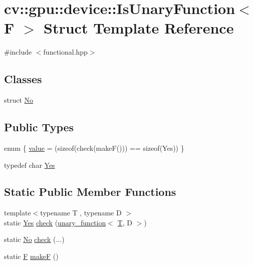 \hypertarget{structcv_1_1gpu_1_1device_1_1IsUnaryFunction}{\section{cv\-:\-:gpu\-:\-:device\-:\-:Is\-Unary\-Function$<$ F $>$ Struct Template Reference}
\label{structcv_1_1gpu_1_1device_1_1IsUnaryFunction}
}


{\ttfamily \#include $<$functional.\-hpp$>$}

\subsection*{Classes}
\begin{DoxyCompactItemize}
\item 
struct \hyperlink{structcv_1_1gpu_1_1device_1_1IsUnaryFunction_1_1No}{No}
\end{DoxyCompactItemize}
\subsection*{Public Types}
\begin{DoxyCompactItemize}
\item 
enum \{ \hyperlink{structcv_1_1gpu_1_1device_1_1IsUnaryFunction_a7682afa8f40d4542d6abc07f46790aa3a819ca7f4c23acab4560d6b157e790dbc}{value} = (sizeof(check(make\-F())) == sizeof(Yes))
 \}
\item 
typedef char \hyperlink{structcv_1_1gpu_1_1device_1_1IsUnaryFunction_af3211ec0f917bee79645b078a0760c7e}{Yes}
\end{DoxyCompactItemize}
\subsection*{Static Public Member Functions}
\begin{DoxyCompactItemize}
\item 
{\footnotesize template$<$typename T , typename D $>$ }\\static \hyperlink{structcv_1_1gpu_1_1device_1_1IsUnaryFunction_af3211ec0f917bee79645b078a0760c7e}{Yes} \hyperlink{structcv_1_1gpu_1_1device_1_1IsUnaryFunction_a017858afbdf7bea86f9982234bb75ae0}{check} (\hyperlink{structcv_1_1gpu_1_1device_1_1unary__function}{unary\-\_\-function}$<$ \hyperlink{calib3d_8hpp_a3efb9551a871ddd0463079a808916717}{T}, D $>$)
\item 
static \hyperlink{structcv_1_1gpu_1_1device_1_1IsUnaryFunction_1_1No}{No} \hyperlink{structcv_1_1gpu_1_1device_1_1IsUnaryFunction_a96c8cef47d3038b247017780bfe2d6ee}{check} (...)
\item 
static \hyperlink{calib3d_8hpp_acc93c21c0e709826b318c946961af8fc}{F} \hyperlink{structcv_1_1gpu_1_1device_1_1IsUnaryFunction_ab3ec22868be162ce7e248a3917569e79}{make\-F} ()
\end{DoxyCompactItemize}


